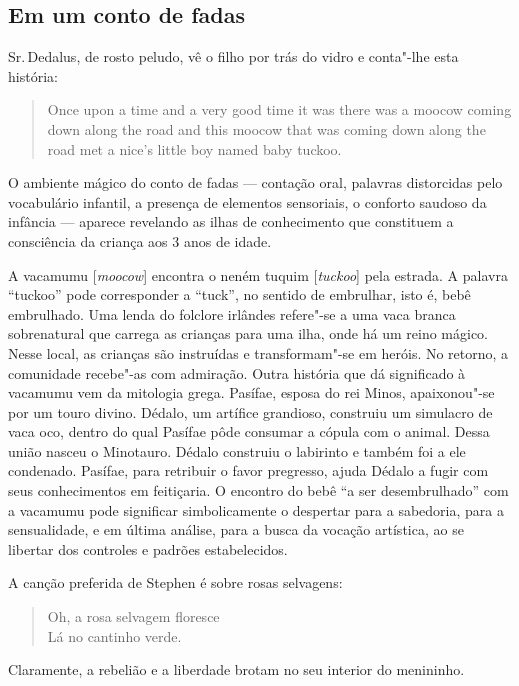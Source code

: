 \subsection{Em um conto de fadas}

Sr.\,Dedalus, de rosto peludo, vê o filho por trás do vidro e conta"-lhe
esta história:

\begin{quote}
Once upon a time and a very good time it was there was a moocow coming
down along the road and this moocow that was coming down along the road
met a nice's little boy named baby tuckoo.
\end{quote}

O ambiente mágico do conto de fadas --- contação oral, palavras
distorcidas pelo vocabulário infantil, a presença de elementos
sensoriais, o conforto saudoso da infância --- aparece revelando as ilhas
de conhecimento que constituem a consciência da criança aos 3 anos de
idade.

A vacamumu [\textit{moocow}] encontra o neném tuquim [\textit{tuckoo}]
pela estrada. A palavra ``tuckoo''
pode corresponder a ``tuck'', no sentido de embrulhar, isto é, bebê
embrulhado. Uma lenda do folclore irlândes refere"-se a uma vaca branca
sobrenatural que carrega as crianças para uma ilha, onde há um reino
mágico. Nesse local, as crianças são instruídas e transformam"-se em
heróis. No retorno, a comunidade recebe"-as com admiração. Outra história
que dá significado à vacamumu vem da mitologia grega. Pasífae, esposa do
rei Minos, apaixonou"-se por um touro divino. Dédalo, um artífice
grandioso, construiu um simulacro de vaca oco, dentro do qual Pasífae
pôde consumar a cópula com o animal. Dessa união nasceu o Minotauro.
Dédalo construiu o labirinto e também foi a ele condenado. Pasífae, para
retribuir o favor pregresso, ajuda Dédalo a fugir com seus conhecimentos
em feitiçaria. O encontro do bebê ``a ser desembrulhado'' com a vacamumu
pode significar simbolicamente o despertar para a sabedoria, para a
sensualidade, e em última análise, para a busca da vocação artística, ao
se libertar dos controles e padrões estabelecidos.

A canção preferida de Stephen é sobre rosas selvagens:

\begin{verse}
Oh, a rosa selvagem floresce\\
Lá no cantinho verde.
\end{verse}

Claramente, a rebelião e a liberdade brotam no seu interior do menininho.

